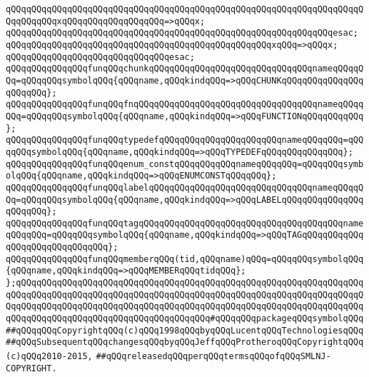 \verb|qQQqqQQqqQQqqQQqqQQqqQQqqQQqqQQqqQQqqQQqqQQqqQQqqQQqqQQqqQQqqQQqqQQqqQQqqQQqqQQqxqQQqqQQqqQQqqQQqqQQq=>qQQqx;|\newline
\verb|qQQqqQQqqQQqqQQqqQQqqQQqqQQqqQQqqQQqqQQqqQQqqQQqqQQqqQQqqQQqqQQqesac;|\newline
\newline
\verb|qQQqqQQqqQQqqQQqqQQqqQQqqQQqqQQqqQQqqQQqqQQqqQQqqQQqxqQQq=>qQQqx;|\newline
\verb|qQQqqQQqqQQqqQQqqQQqqQQqqQQqqQQqesac;|\newline
\newline
\verb|qQQqqQQqqQQqqQQqfunqQQqchunkqQQqqQQqqQQqqQQqqQQqqQQqqQQqqQQqnameqQQqqQQq=qQQqqQQqsymbolqQQq{qQQqname,qQQqkindqQQq=>qQQqCHUNKqQQqqQQqqQQqqQQqqQQqqQQq};|\newline
\verb|qQQqqQQqqQQqqQQqfunqQQqfnqQQqqQQqqQQqqQQqqQQqqQQqqQQqqQQqqQQqnameqQQqqQQq=qQQqqQQqsymbolqQQq{qQQqname,qQQqkindqQQq=>qQQqFUNCTIONqQQqqQQqqQQq};|\newline
\verb|qQQqqQQqqQQqqQQqfunqQQqtypedefqQQqqQQqqQQqqQQqqQQqqQQqnameqQQqqQQq=qQQqqQQqsymbolqQQq{qQQqname,qQQqkindqQQq=>qQQqTYPEDEFqQQqqQQqqQQqqQQq};|\newline
\newline
\verb|qQQqqQQqqQQqqQQqfunqQQqenum_constqQQqqQQqqQQqnameqQQqqQQq=qQQqqQQqsymbolqQQq{qQQqname,qQQqkindqQQq=>qQQqENUMCONSTqQQqqQQq};|\newline
\verb|qQQqqQQqqQQqqQQqfunqQQqlabelqQQqqQQqqQQqqQQqqQQqqQQqqQQqqQQqnameqQQqqQQq=qQQqqQQqsymbolqQQq{qQQqname,qQQqkindqQQq=>qQQqLABELqQQqqQQqqQQqqQQqqQQqqQQq};|\newline
\newline
\verb|qQQqqQQqqQQqqQQqfunqQQqtagqQQqqQQqqQQqqQQqqQQqqQQqqQQqqQQqqQQqqQQqnameqQQqqQQq=qQQqqQQqsymbolqQQq{qQQqname,qQQqkindqQQq=>qQQqTAGqQQqqQQqqQQqqQQqqQQqqQQqqQQqqQQq};|\newline
\verb|qQQqqQQqqQQqqQQqfunqQQqmemberqQQq(tid,qQQqname)qQQq=qQQqqQQqsymbolqQQq{qQQqname,qQQqkindqQQq=>qQQqMEMBERqQQqtidqQQq};|\newline
\newline
\verb|};qQQqqQQqqQQqqQQqqQQqqQQqqQQqqQQqqQQqqQQqqQQqqQQqqQQqqQQqqQQqqQQqqQQqqQQqqQQqqQQqqQQqqQQqqQQqqQQqqQQqqQQqqQQqqQQqqQQqqQQqqQQqqQQqqQQqqQQqqQQqqQQqqQQqqQQqqQQqqQQqqQQqqQQqqQQqqQQqqQQqqQQqqQQqqQQqqQQqqQQqqQQqqQQqqQQqqQQqqQQqqQQqqQQqqQQqqQQqqQQqqQQqqQQq#qQQqqQQqpackageqQQqsymbolqQQq|\newline
\newline
\newline
\verb|##qQQqqQQqCopyrightqQQq(c)qQQq1998qQQqbyqQQqLucentqQQqTechnologiesqQQq|\newline
\verb|##qQQqSubsequentqQQqchangesqQQqbyqQQqJeffqQQqProtheroqQQqCopyrightqQQq(c)qQQq2010-2015,|\newline
\verb|##qQQqreleasedqQQqperqQQqtermsqQQqofqQQqSMLNJ-COPYRIGHT.|\newline


